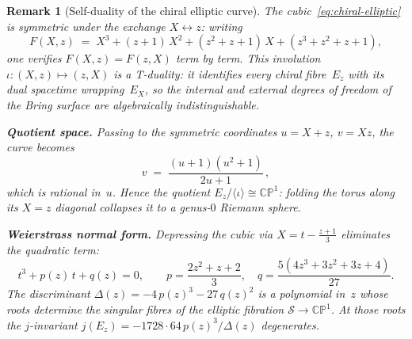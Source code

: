 \documentclass[12pt,a4paper]{report}
\newtheorem{remark}[theorem]{Remark}
\begin{document}
\begin{remark}[Self-duality of the chiral elliptic curve]
\label{rem:t-duality-elliptic}
The cubic~\eqref{eq:chiral-elliptic} is symmetric under the exchange
$X\leftrightarrow z$: writing
\[
  F(X,z)\;=\;X^3+(z+1)\,X^2+(z^2+z+1)\,X+(z^3+z^2+z+1),
\]
one verifies $F(X,z)=F(z,X)$ term by term.  This involution
$\iota\colon(X,z)\mapsto(z,X)$ is a \emph{T-duality}: it identifies
every chiral fibre~$E_z$ with its dual spacetime wrapping~$E_X$, so
the internal and external degrees of freedom of the Bring surface are
algebraically indistinguishable.

\medskip\noindent\textbf{Quotient space.}\;
Passing to the symmetric coordinates $u=X+z$, $v=Xz$, the curve
becomes
\begin{equation}\label{eq:symmetric-quotient}
  v \;=\; \frac{(u+1)(u^2+1)}{2u+1}\,,
\end{equation}
which is rational in~$u$.  Hence the quotient
$E_z/\langle\iota\rangle\cong\mathbb{CP}^1$: folding the torus along
its $X=z$ diagonal collapses it to a genus-$0$ Riemann sphere.

\medskip\noindent\textbf{Weierstrass normal form.}\;
Depressing the cubic via $X=t-\tfrac{z+1}{3}$ eliminates the quadratic
term:
\begin{equation}\label{eq:weierstrass-depressed}
  t^{3}+p(z)\,t+q(z)=0,\qquad
  p=\frac{2z^2+z+2}{3},\quad
  q=\frac{5(4z^3+3z^2+3z+4)}{27}.
\end{equation}
The discriminant $\Delta(z)=-4\,p(z)^3-27\,q(z)^2$ is a polynomial in~$z$
whose roots determine the singular fibres of the elliptic
fibration $\mathcal{S}\to\mathbb{CP}^1$.  At those roots the
$j$-invariant $j(E_z)=-1728\cdot 64\,p(z)^3/\Delta(z)$ degenerates.
\end{remark}
\end{document}
